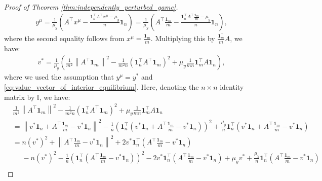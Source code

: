 \documentclass{article}
\newcommand{\bone}{\mathbf{1}}
\theoremstyle{plain}
\begin{document}
\begin{proof}[Proof of Theorem \ref{thm:independently_perturbed_game}]
    \begin{align*}
        y^{\mu} = \frac{1}{\mu_y}\left(A^{\top}x^{\mu} - \frac{\bone_n^{\top}A^{\top}x^{\mu} - \mu_y}{n}\bone_n\right) = \frac{1}{\mu_y}\left(A^{\top}\frac{\bone_m}{m} - \frac{\bone_n^{\top}A^{\top}\frac{\bone_m}{m} - \mu_y}{n}\bone_n\right),
    \end{align*}
    where the second equality follows from $x^{\mu} = \frac{\bone_m}{m}$.
    Multiplying this by $\frac{\bone_m^{\top}}{m}A$, we have:
    \begin{align}
        v^{\ast} = \frac{1}{\mu_y}\left(\frac{1}{m^2}\left\|A^{\top}\bone_m\right\|^2 - \frac{1}{m^2n}(\bone_n^{\top}A^{\top}\bone_m)^2  + \mu_y\frac{1}{m n}\bone_m^{\top}A\bone_n\right),
        \label{eq:game_value_equivalence_in_independently_perturbed_minimax_optimization}
    \end{align}
    where we used the assumption that $y^{\mu} = y^{\ast}$ and \eqref{eq:value_vector_of_interior_equilibrium}.
    Here, denoting the $n\times n$ identity matrix by $\mathbb{I}$, we have:
    \begin{align}
        & \frac{1}{m^2}\left\|A^{\top}\bone_m\right\|^2 - \frac{1}{m^2n}(\bone_n^{\top}A^{\top}\bone_m)^2  + \mu_y\frac{1}{m n}\bone_m^{\top}A\bone_n \nonumber                                                                                                                                                                               \\
        & = \left\|v^{\ast}\bone_n + A^{\top}\frac{\bone_m}{m} - v^{\ast}\bone_n\right\|^2 - \frac{1}{n}\left(\bone_n^{\top}\left(v^{\ast}\bone_n + A^{\top}\frac{\bone_m}{m} - v^{\ast}\bone_n\right)\right)^2 + \frac{\mu_y}{n}\bone_n^{\top}\left(v^{\ast}\bone_n + A^{\top}\frac{\bone_m}{m} - v^{\ast}\bone_n\right) \nonumber           \\
        & = n (v^{\ast})^2 + \left\|A^{\top}\frac{\bone_m}{m} - v^{\ast}\bone_n\right\|^2 + 2v^{\ast}\bone_n^{\top}\left(A^{\top}\frac{\bone_m}{m} - v^{\ast}\bone_n\right) \nonumber                                                                                                                                                         \\
        & \phantom{=} - n(v^{\ast})^2 - \frac{1}{n}\left(\bone_n^{\top}\left(A^{\top}\frac{\bone_m}{m} - v^{\ast}\bone_n\right)\right)^2 - 2v^{\ast}\bone_n^{\top}\left(A^{\top}\frac{\bone_m}{m} - v^{\ast}\bone_n\right) + \mu_y v^{\ast} + \frac{\mu_y}{n}\bone_n^{\top}\left(A^{\top}\frac{\bone_m}{m} - v^{\ast}\bone_n\right) \nonumber \\

\end{align}
\end{proof}
\end{document}
